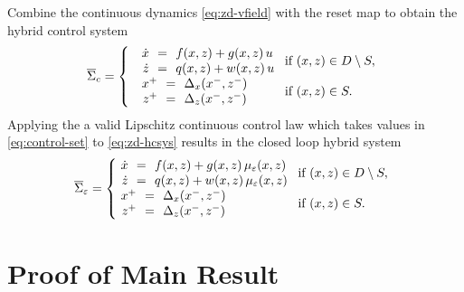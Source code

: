 \documentclass[twocolumn]{article}
\begin{document}
Combine the continuous dynamics \eqref{eq:zd-vfield} with the reset map to obtain the hybrid control system
\begin{align}
  \label{eq:zd-hcsys}
  \HCSbar= \left\{
  \begin{array}{l l}
    \begin{array}{r c l}
      {\dot \zdx} &\!\!=\!\!& f(\zdx, \zdz) + g(\zdx, \zdz) \, u\\
      {\dot \zdz} &\!\!=\!\!& q(\zdx, \zdz) + w(\zdx, \zdz) \, u
    \end{array} \!\! & \!\! \mbox{if } (\zdx, \zdz) \in \D \setminus \S,\\
    \begin{array}{r c l}
      \zdx^{+} &\!\!=\!\!& \Delta_{\zdx}(\zdx^{-}, \zdz^{-})\\
      \zdz^{+} &\!\!=\!\!& \Delta_{\zdz}(\zdx^{-}, \zdz^{-})
    \end{array} \!\! & \!\! \mbox{if } (\zdx, \zdz) \in \S.
  \end{array}\right.
\end{align}
%
Applying the a valid Lipschitz continuous control law which takes values in \eqref{eq:control-set} to \eqref{eq:zd-hcsys} results in the closed loop hybrid system
%
\begin{align}
  \label{eq:zd-hsys-cl}
  \HSbar_{\resclfparam} = \left\{\!\!\!\!
  \begin{array}{l l}
    \begin{array}{r c l}
      {\dot \zdx} &\!\!=\!\!& f(\zdx, \zdz) + g(\zdx, \zdz) \, \mueps(\zdx, \zdz)\\
      {\dot \zdz} &\!\!=\!\!& q(\zdx, \zdz) + w(\zdx, \zdz) \, \mueps(\zdx, \zdz)
    \end{array} \!\! & \!\! \mbox{if } (\zdx, \zdz) \in \D \setminus \S,\\
    \begin{array}{r c l}
      \zdx^{+} &\!\!=\!\!& \Delta_{\zdx}(\zdx^{-}, \zdz^{-})\\
      \zdz^{+} &\!\!=\!\!& \Delta_{\zdz}(\zdx^{-}, \zdz^{-})
    \end{array} \!\! & \!\! \mbox{if } (\zdx, \zdz) \in \S.
  \end{array}\right.
\end{align}

\section{Proof of Main Result}
\end{document}
